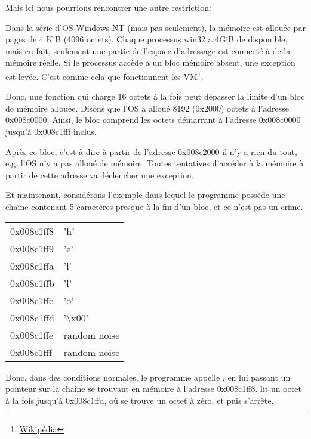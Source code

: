 Mais ici nous pourrions rencontrer une autre restriction:

\newcommand{\URLPAGE}{\href{http://en.wikipedia.org/wiki/Page_(computer_memory)}{Wikipédia}}

Dans la série d'\ac{OS} \gls{Windows NT} (mais pas seulement), la mémoire est allouée
par pages de 4 KiB (4096 octets).
Chaque processus win32 a 4GiB de disponible, mais en fait, seulement une partie
de l'espace d'adressage est connecté à de la mémoire réelle.
Si le processus accède a un bloc mémoire absent, une exception est levée.
C'est comme cela que fonctionnent les \ac{VM}\footnote{\URLPAGE}.

Donc, une fonction qui charge 16 octets à la fois peut dépasser la limite d'un bloc
de mémoire allouée.
Disons que l'\ac{OS} a alloué 8192 (0x2000) octets à l'adresse 0x008c0000.
Ainsi, le bloc comprend les octets démarrant à l'adresse 0x008c0000 jusqu'à 0x008c1fff
inclus.

Après ce bloc, c'est à dire à partir de l'adresse 0x008c2000 il n'y a rien du tout,
e.g. l'\ac{OS} n'y a pas alloué de mémoire.
Toutes tentatives d'accéder à la mémoire à partir de cette adresse va déclencher
une exception.

Et maintenant, considérons l'exemple dans lequel le programme possède une chaîne
contenant 5 caractères presque à la fin d'un bloc, et ce n'est pas un crime.

\begin{center}
  \begin{tabular}{ | l | l | }
    \hline
        0x008c1ff8 & 'h' \\
        0x008c1ff9 & 'e' \\
        0x008c1ffa & 'l' \\
        0x008c1ffb & 'l' \\
        0x008c1ffc & 'o' \\
        0x008c1ffd & '\textbackslash{}x00' \\
        0x008c1ffe & random noise \\
        0x008c1fff & random noise \\
    \hline
  \end{tabular}
\end{center}

Donc, dans des conditions normales, le programme appelle \strlen, en lui passant un
pointeur sur la chaîne  se trouvant en mémoire à l'adresse 0x008c1ff8.
\strlen lit un octet à la fois jusqu'à 0x008c1ffd, où se trouve un octet à zéro,
et puis s'arrête.

